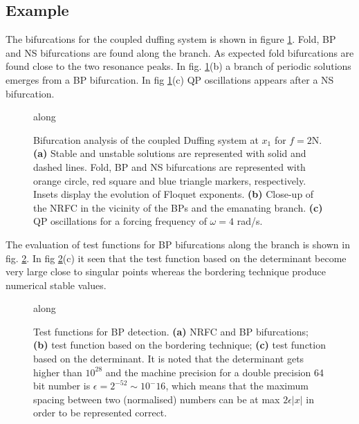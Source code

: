\subsection{Example}
\label{sec:bif_example}

The bifurcations for the coupled duffing system is shown in figure
\ref{fig:bif_example}. Fold, BP and NS bifurcations are found along the branch.
As expected fold bifurcations are found close to the two resonance peaks. In
fig. \ref{fig:bif_example}(b) a branch of periodic solutions emerges from a BP
bifurcation. In fig \ref{fig:bif_example}(c) QP oscillations appears after a NS
bifurcation.

\begin{figure}[ht!]
  \centering
  \begin{mdframed}
     along
  \end{mdframed}
  \caption{Bifurcation analysis of the coupled Duffing system at $x_1$ for
    $f=2$N.
    \textbf{(a)} Stable and unstable solutions are represented with solid and
    dashed lines. Fold, BP and NS bifurcations are represented with orange
    circle, red square and blue triangle markers, respectively.
    Insets display the evolution of Floquet exponents.
    \textbf{(b)} Close-up of the NRFC in the vicinity of the BPs and the
    emanating branch.
    \textbf{(c)} QP oscillations for a forcing frequency of $\omega=4$ rad/s.}
  \label{fig:bif_example}
\end{figure}

The evaluation of test functions for BP bifurcations along the branch is shown
in fig. \ref{fig:bif_BPtestfunction}. In fig \ref{fig:bif_BPtestfunction}(c) it
seen that the test function based on the determinant become very large close to
singular points whereas the bordering technique produce numerical stable values.

\begin{figure}[ht!]
  \centering
  \begin{mdframed}
    along
  \end{mdframed}
  \caption{Test functions for BP detection.
    \textbf{(a)} NRFC and BP bifurcations;
    \textbf{(b)} test function based on the bordering technique;
    \textbf{(c)} test function based on the determinant. It is noted that the
    determinant gets higher than $10^{28}$ and the machine precision for a
    double precision 64 bit number is $\epsilon = 2^{-52} \sim 10^-{16}$,
    which means that the maximum spacing between two (normalised) numbers can be
    at max $2\epsilon |x|$ in order to be represented correct.}
  \label{fig:bif_BPtestfunction}
\end{figure}

